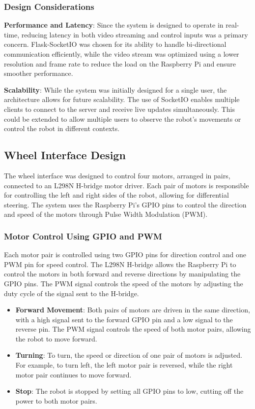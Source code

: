 \subsubsection{Design Considerations}

\textbf{Performance and Latency}: Since the system is designed to operate in real-time, reducing latency in both video streaming and control inputs was a primary concern. Flask-SocketIO was chosen for its ability to handle bi-directional communication efficiently, while the video stream was optimized using a lower resolution and frame rate to reduce the load on the Raspberry Pi and ensure smoother performance.

\textbf{Scalability}: While the system was initially designed for a single user, the architecture allows for future scalability. The use of SocketIO enables multiple clients to connect to the server and receive live updates simultaneously. This could be extended to allow multiple users to observe the robot's movements or control the robot in different contexts.


\subsection{Wheel Interface Design}

The wheel interface was designed to control four motors, arranged in pairs, connected to an L298N H-bridge motor driver. Each pair of motors is responsible for controlling the left and right sides of the robot, allowing for differential steering. The system uses the Raspberry Pi's GPIO pins to control the direction and speed of the motors through Pulse Width Modulation (PWM).

\subsubsection{Motor Control Using GPIO and PWM}

Each motor pair is controlled using two GPIO pins for direction control and one PWM pin for speed control. The L298N H-bridge allows the Raspberry Pi to control the motors in both forward and reverse directions by manipulating the GPIO pins. The PWM signal controls the speed of the motors by adjusting the duty cycle of the signal sent to the H-bridge.

\begin{itemize}
	\item \textbf{Forward Movement}: Both pairs of motors are driven in the same direction, with a high signal sent to the forward GPIO pin and a low signal to the reverse pin. The PWM signal controls the speed of both motor pairs, allowing the robot to move forward.
	\item \textbf{Turning}: To turn, the speed or direction of one pair of motors is adjusted. For example, to turn left, the left motor pair is reversed, while the right motor pair continues to move forward.
	\item \textbf{Stop}: The robot is stopped by setting all GPIO pins to low, cutting off the power to both motor pairs.
\end{itemize}

